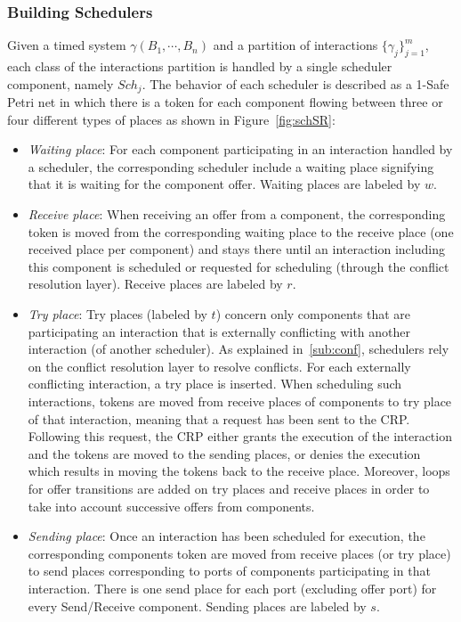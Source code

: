 \subsubsection{Building Schedulers}
  Given a timed system $\gamma(B_1,\cdots,B_n)$ and a partition of interactions 
  $\{\gamma_j\}^m_{j=1}$, each class of the interactions partition is handled by a single
  scheduler component, namely $Sch_j$.
  The behavior of each scheduler is described as a 1-Safe Petri net in which there is a token
  for each component flowing between three or four different types of places as shown
  in Figure~\ref{fig:schSR}:
  
  \begin{itemize}
    \item \emph{Waiting place}: For each component participating in an interaction handled by
      a scheduler, the corresponding scheduler include a waiting place signifying that 
      it is waiting for the component offer. Waiting places are labeled by $w$. 
    \item \emph{Receive place}: When receiving an offer from a component, the corresponding
      token is moved from the corresponding waiting place to the receive place (one received
      place per component) and stays there until an interaction including this component is 
      scheduled or requested for scheduling (through the conflict resolution layer). 
      Receive places are labeled by $r$.
    \item \emph{Try place}: Try places (labeled by $t$) 
      concern only components that are participating an interaction that is externally
      conflicting with another interaction (of another scheduler). 
      As explained in~\ref{sub:conf}, schedulers
      rely on the conflict resolution layer to resolve conflicts. For each externally
      conflicting interaction, a try place is inserted. When scheduling such interactions,
      tokens are moved from receive places of components to try place of that interaction, 
      meaning that a request has been sent to the CRP. Following this request, the CRP 
      either grants the execution
      of the interaction and the tokens are moved to the sending places, or denies the execution
      which results in moving the tokens back to the receive place.
      Moreover, loops for offer transitions are added on try places and receive places
      in order to take into account successive offers from components. 
    \item \emph{Sending place}: Once an interaction has been scheduled for execution,
      the corresponding components token are moved from receive places (or try place) to
      send places corresponding to ports of components participating in that interaction. 
      There is one send place for each port (excluding offer port) 
      for every Send/Receive component.
      Sending places are labeled by $s$.
  \end{itemize}
